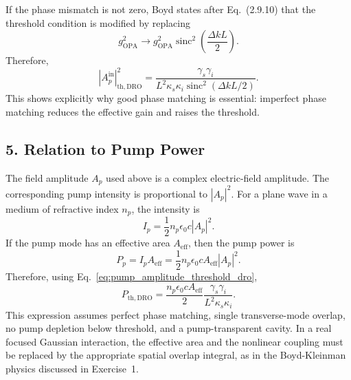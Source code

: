 \begin{resolucao}[Solution]
    If the phase mismatch is not zero, Boyd states after Eq.~(2.9.10) that the threshold condition is modified by replacing
    \begin{equation}
        g_{\mathrm{OPA}}^2
        \longrightarrow
        g_{\mathrm{OPA}}^2
        \operatorname{sinc}^2
        \left(
            \frac{\Delta kL}{2}
        \right).
    \end{equation}
    Therefore,
    \begin{equation}
        |A_p^{\mathrm{in}}|_{\mathrm{th,DRO}}^2
        =
        \frac{
            \gamma_s\gamma_i
        }{
            L^2\kappa_s\kappa_i
            \operatorname{sinc}^2(\Delta kL/2)
        }.
        \label{eq:dro_threshold_with_mismatch}
    \end{equation}
    This shows explicitly why good phase matching is essential: imperfect phase matching reduces the effective gain and raises the threshold.

\subsection*{5. Relation to Pump Power}

    The field amplitude $A_p$ used above is a complex electric-field amplitude. The corresponding pump intensity is proportional to $|A_p|^2$. For a plane wave in a medium of refractive index $n_p$, the intensity is
    \begin{equation}
        I_p
        =
        \frac{1}{2}
        n_p\epsilon_0c
        |A_p|^2.
        \label{eq:intensity_field_relation}
    \end{equation}
    If the pump mode has an effective area $A_{\mathrm{eff}}$, then the pump power is
    \begin{equation}
        P_p
        =
        I_p A_{\mathrm{eff}}
        =
        \frac{1}{2}
        n_p\epsilon_0c
        A_{\mathrm{eff}}
        |A_p|^2.
        \label{eq:power_field_relation}
    \end{equation}
    Therefore, using Eq.~\eqref{eq:pump_amplitude_threshold_dro},
    \begin{equation}
        \boxed{
        P_{\mathrm{th,DRO}}
        =
        \frac{
            n_p\epsilon_0cA_{\mathrm{eff}}
        }{
            2
        }
        \frac{
            \gamma_s\gamma_i
        }{
            L^2\kappa_s\kappa_i
        }
        }.
        \label{eq:threshold_power_dro}
    \end{equation}
    This expression assumes perfect phase matching, single transverse-mode overlap, no pump depletion below threshold, and a pump-transparent cavity. In a real focused Gaussian interaction, the effective area and the nonlinear coupling must be replaced by the appropriate spatial overlap integral, as in the Boyd-Kleinman physics discussed in Exercise~1.


\end{resolucao}
